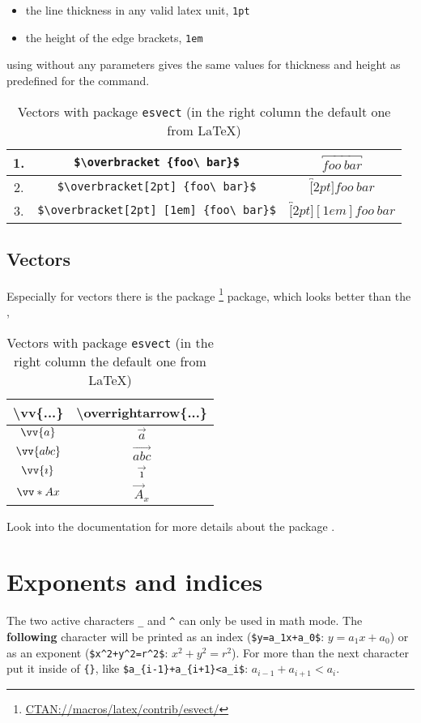 \begin{table}[htb]
\begin{itemize}
\item the line thickness in any valid latex unit, \eg \verb/1pt/
\item the height of the edge brackets, \eg \verb/1em/
\end{itemize}
using without any parameters gives the same values for thickness and
height as predefined for the  command.


\vspace{0.3cm}
\begin{center}\begin{tabular}{|c|c|c|}
\hline
1.&\verb/$\overbracket {foo\ bar}$/ & $\overbracket {foo\ bar}$ \tabularnewline\hline
2.&\verb/$\overbracket[2pt] {foo\ bar}$/ &$\overbracket[2pt] {foo\ bar}$ \tabularnewline\hline
3.&\verb/$\overbracket[2pt] [1em] {foo\ bar}$/&$\overbracket[2pt] [1em] {foo\ bar}$\tabularnewline\hline
\end{tabular}
\end{center}

\subsection{Vectors}

Especially for vectors there is the package %
\footnote{\href{http://www.ctan.org/tex-archive/macros/latex/contrib/esvect/}%
	{CTAN://macros/latex/contrib/esvect/}} package, which looks better than the
, \eg

\begin{table}[!htb]
\centering
\begin{tabular}{c|c}
\textbackslash{}vv\{...\}&\textbackslash{}overrightarrow\{...\}\tabularnewline\hline
$\vv{a}$ & $\overrightarrow{a}$\tabularnewline
$\vv{abc}$ & $\overrightarrow{abc}$\tabularnewline
$\vv{\imath}$ & $\overrightarrow{\imath}$\tabularnewline
$\vv*{A}{x}$ & $\overrightarrow{A}_{x}$\tabularnewline
\end{tabular}
\caption[Vectors with package \texttt{esvect}]%
    {Vectors with package \texttt{esvect} (in the right column the default one from \LaTeX{})}
\end{table}


Look into the documentation for more details about the package .

\section{Exponents and indices}\label{sec:exponents}
The two active characters \verb|_| and \verb|^| can only be used in math mode. The
\textbf{following} character will be printed as an index (\verb|$y=a_1x+a_0$|: $y=a_1x+a_0$)
or as an exponent (\verb|$x^2+y^2=r^2$|: $x^2+y^2=r^2$). For more than the next character
put it inside of \verb|{}|, like \verb|$a_{i-1}+a_{i+1}<a_i$|: $a_{i-1}+a_{i+1}<a_i$.


\end{table}
